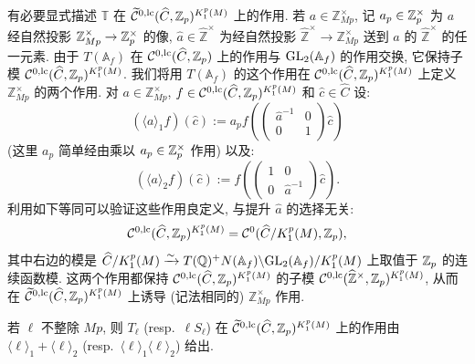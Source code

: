 有必要显式描述 $\mathbb{T}$ 在 $\widetilde{\mathcal{C}}{}^{0,\mathrm{lc}}(\widehat{C},\mathbb{Z}_p)^{K_1^{p}(M)}$ 上的作用.
若 $a \in \mathbb{Z}_{Mp}^{\times}$, 记 $a_p \in \mathbb{Z}_p^{\times}$ 为 $a$ 经自然投影 $\mathbb{Z}_{Mp}^{\times} \to \mathbb{Z}_p^{\times}$ 的像, $\widehat{a} \in \widehat{\mathbb{Z}}^{\times}$ 为经自然投影 $\widehat{\mathbb{Z}}^{\times} \to \mathbb{Z}_{Mp}^{\times}$ 送到 $a$ 的 $\widehat{\mathbb{Z}}^{\times}$ 的任一元素.
由于 $T(\mathbb{A}_f)$ 在 $\mathcal{C}^{0,\mathrm{lc}}(\widehat{C},\mathbb{Z}_p)$ 上的作用与 $\mathrm{GL}_2(\mathbb{A}_f)$ 的作用交换, 它保持子模 $\mathcal{C}^{0,\mathrm{lc}}(\widehat{C},\mathbb{Z}_p)^{K_1^{p}(M)}$.
我们将用 $T(\mathbb{A}_f)$ 的这个作用在 $\mathcal{C}^{0,\mathrm{lc}}(\widehat{C},\mathbb{Z}_p)^{K_1^{p}(M)}$ 上定义 $\mathbb{Z}_{Mp}^{\times}$ 的两个作用.
对 $a \in \mathbb{Z}_{Mp}^{\times}$, $f \in \mathcal{C}^{0,\mathrm{lc}}(\widehat{C},\mathbb{Z}_p)^{K_1^{p}(M)}$ 和 $\widehat{c} \in \widehat{C}$ 设:
\[
(\langle a \rangle_1 f)(\widehat{c}) := a_p f\!\left(\begin{pmatrix} \widehat{a}^{-1} & 0 \\ 0 & 1 \end{pmatrix}\widehat{c}\right)
\]
(这里 $a_p$ 简单经由乘以 $a_p \in \mathbb{Z}_p^{\times}$ 作用) 以及:
\[
(\langle a \rangle_2 f)(\widehat{c}) := f\!\left(\begin{pmatrix} 1 & 0 \\ 0 & \widehat{a}^{-1} \end{pmatrix}\widehat{c}\right).
\]
利用如下等同可以验证这些作用良定义, 与提升 $\widehat{a}$ 的选择无关:
\begin{equation}
\label{eq:10}
\mathcal{C}^{0,\mathrm{lc}}(\widehat{C},\mathbb{Z}_p)^{K_1^{p}(M)} = \mathcal{C}^{0}(\widehat{C}/K_1^{p}(M),\mathbb{Z}_p),
\end{equation}
其中右边的模是 $\widehat{C}/K_1^{p}(M) \xrightarrow{\sim} T(\mathbb{Q})^{+}N(\mathbb{A}_f)\backslash \mathrm{GL}_2(\mathbb{A}_f)/K_1^{p}(M)$ 上取值于 $\mathbb{Z}_p$ 的连续函数模.
这两个作用都保持 $\mathcal{C}^{0,\mathrm{lc}}(\widehat{C},\mathbb{Z}_p)^{K_1^{p}(M)}$ 的子模 $\mathcal{C}^{0,\mathrm{lc}}(\widehat{\mathbb{Z}}^{\times},\mathbb{Z}_p)^{K_1^{p}(M)}$, 从而在 $\widetilde{\mathcal{C}}{}^{0,\mathrm{lc}}(\widehat{C},\mathbb{Z}_p)^{K_1^{p}(M)}$ 上诱导 (记法相同的) $\mathbb{Z}_{Mp}^{\times}$ 作用.

\begin{lemma}\label{lem:3.1.2}
若 $\ell$ 不整除 $Mp$, 则 $T_{\ell}$ (resp.\ $\ell S_{\ell}$) 在 $\widetilde{\mathcal{C}}{}^{0,\mathrm{lc}}(\widehat{C},\mathbb{Z}_p)^{K_1^{p}(M)}$ 上的作用由 $\langle \ell \rangle_1 + \langle \ell \rangle_2$ (resp.\ $\langle \ell \rangle_1\langle \ell \rangle_2$) 给出.
\end{lemma}

